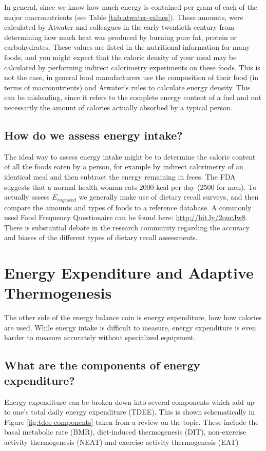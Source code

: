 \documentclass{tufte-handout}
\begin{document}
In general, since we know how much energy is contained per gram of each of the major macronutrients (see Table \ref{tab:atwater-values}).  These amounts, were calculated by Atwater and colleagues in the early twentieth century from determining how much heat was produced by burning pure fat, protein or carbohydrates.  These values are listed in the nutritional information for many foods, and you might expect that the caloric density of your meal may be calculated by performing indirect calorimetry experiments on these foods.  This is not the case, in general food manufacturers use the composition of their food (in terms of macronutrients) and Atwater's rules to calculate energy density.  This can be misleading, since it refers to the complete energy content of a fuel and not necessarily the amount of calories actually absorbed by a typical person.

\subsection{How do we assess energy intake?}

The ideal way to assess energy intake might be to determine the caloric content of all the foods eaten by a person, for example by indirect calorimetry of an identical meal and then subtract the energy remaining in feces.  The FDA suggests that a normal health woman eats 2000 kcal per day (2500 for men).  To actually assess $E_{ingested}$ we generally make use of dietary recall surveys, and then compare the amounts and types of foods to a reference database.  A commonly used Food Frequency Questionaire can be found here: \url{http://bit.ly/2oucJw8}.  There is substantial debate in the research community regarding the accuracy and biases of the different types of dietary recall assessments.


\section{Energy Expenditure and Adaptive Thermogenesis}

The other side of the energy balance coin is energy expenditure, how how calories are used.  While energy intake is difficult to measure, energy expenditure is even harder to measure accurately without specialized equipment.  
\subsection{What are the components of energy expenditure?}
Energy expenditure can be broken down into several components which add up to one's total daily energy expenditure (TDEE).  This is shown schematically in Figure \ref{fig:tdee-components} taken from a review on the topic\cite{Tam2015}.  These include the basal metabolic rate (BMR), diet-induced thermogenesis (DIT), non-exercise activity thermogenesis (NEAT) and exercise activity thermogenesis (EAT)
\end{document}
